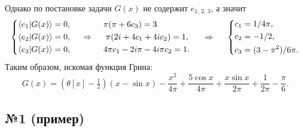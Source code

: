 Однако по постановке задачи $G(x)$ не содержит $e_{1,\, 2,\, 3}$, а значит
\begin{equation*}
    \left\{\begin{aligned}
        \langle e_1 | G(x) \rangle &= 0,
        \hspace{0.5cm} \phantom{\Rightarrow} \hspace{0.5cm}
        \pi (\pi + 6 c_3) = 3 \\
        \langle e_2 | G(x) \rangle &= 0,
        \hspace{0.5cm} \Rightarrow \hspace{0.5cm}
        \pi(2 i + 4 c_1 + 4 i c_2) =1, \\
        \langle e_3 | G(x) \rangle &= 0,
        \hspace{0.5cm} \phantom{\Rightarrow} \hspace{0.5cm}
        4 \pi c_1 - 2 i \pi  - 4 i \pi c_2 = 1.
    \end{aligned}\right.
    \hspace{0.5cm} \Rightarrow \hspace{0.5cm}
    \left\{\begin{aligned}
        c_1 &= 1/4\pi, \\
        c_2 &= -1/2, \\
        c_3 &= (3-\pi^2)/6 \pi. \\
    \end{aligned}\right.
\end{equation*}
Таким образом, искомая функция Грина:
\begin{equation*}
   G(x) =  (\theta[x] - \tfrac{1}{2}) (x - \sin x) 
    -\frac{x^2}{4\pi} + \frac{5 \cos x}{4\pi} + \frac{x \sin x}{2\pi} + \frac{1}{2\pi}-\frac{\pi}{6}.
\end{equation*}


\subsection*{№1 (пример)}


